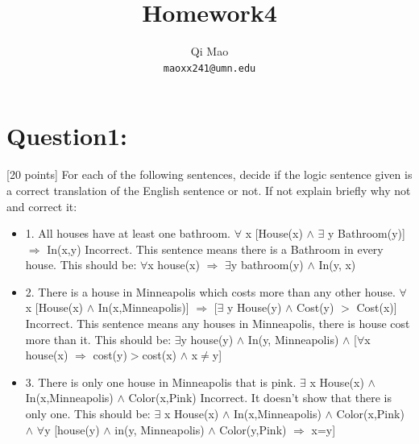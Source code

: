 \documentclass{article}
\begin{document}
\title{Homework4}
\author{Qi Mao\\
  \texttt{maoxx241@umn.edu}}
\maketitle
\section{Question1:}
[20 points] For each of the following sentences, decide if the logic sentence given is a correct translation of the English sentence or not. If not explain briefly why not and correct it:
\begin{itemize}
    \item 1.	All houses have at least one bathroom. \newline
    $\forall$ x [House(x) $\wedge$ $\exists$ y Bathroom(y)] $\Rightarrow$ In(x,y)\newline
    \break
    Incorrect. This sentence means there is a Bathroom in every house. This should be:\newline
    $\forall$x house(x) $\Rightarrow$ $\exists$y bathroom(y) $\wedge$ In(y, x)

    \item 2.    There is a house in Minneapolis which costs more than any other house. \newline
    $\forall$ x [House(x) $\wedge$ In(x,Minneapolis)] $\Rightarrow$ [$\exists$ y House(y) $\wedge$ Cost(y) $>$ Cost(x)]\newline
    \break
    Incorrect. This sentence means any houses in Minneapolis, there is house cost more than it. This should be:\newline
    $\exists$y house(y) $\wedge$ In(y, Minneapolis) $\wedge$ [$\forall$x house(x) $\Rightarrow$ cost(y)$>$cost(x) $\wedge$ x$\neq$y]

    \item 3.    There is only one house in Minneapolis that is pink. \newline
    $\exists$ x House(x) $\wedge$ In(x,Minneapolis) $\wedge$ Color(x,Pink)\newline
    \break
    Incorrect. It doesn’t show that there is only one. This should be:\newline
    $\exists$ x House(x) $\wedge$ In(x,Minneapolis) $\wedge$ Color(x,Pink) $\wedge$ $\forall$y [house(y) $\wedge$ in(y, Minneapolis) $\wedge$ Color(y,Pink) $\Rightarrow$ x=y]


\end{itemize}
\end{document}
